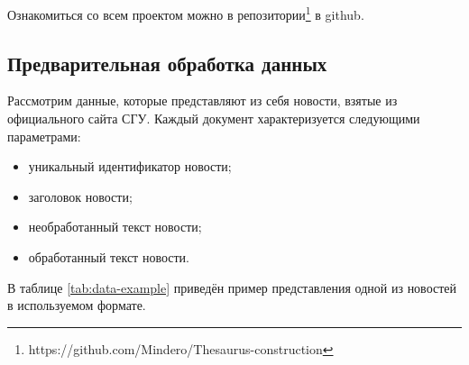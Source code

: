 \documentclass[coursework]{SCWorks}
\begin{document}
Ознакомиться со всем проектом можно в репозитории\footnote{https://github.com/Mindero/Thesaurus-construction} в github.
\subsection{Предварительная обработка данных}
Рассмотрим данные, которые представляют из себя новости, взятые из официального сайта СГУ. Каждый документ характеризуется следующими параметрами:
\begin{itemize}
  \item уникальный идентификатор новости;
  \item заголовок новости;
  \item необработанный текст новости;
  \item обработанный текст новости.
\end{itemize}

В таблице \ref{tab:data-example} приведён пример представления одной из новостей в используемом формате.
\end{document}
